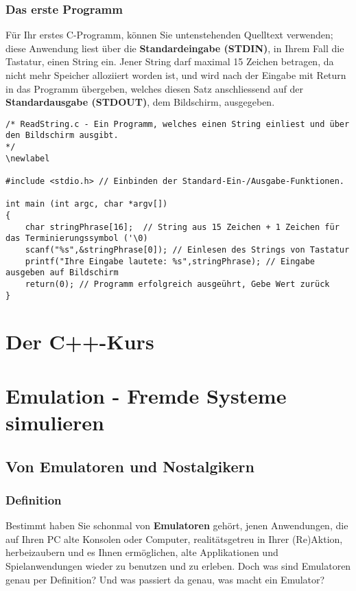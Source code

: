 \documentclass[b5paper,10pt,dvips,fleqn,titlepage,twoside]{book}
\begin{document}
\section{Das erste Programm}
Für Ihr erstes C-Programm, können Sie untenstehenden Quelltext verwenden; diese Anwendung liest über die \textbf{Standardeingabe (STDIN)}, in Ihrem Fall die Tastatur, einen String ein. Jener String darf maximal 15 Zeichen betragen, da nicht mehr Speicher alloziiert worden ist, und wird nach der Eingabe mit Return in das Programm übergeben, welches diesen Satz anschliessend auf der \textbf{Standardausgabe (STDOUT)}, dem Bildschirm, ausgegeben.
\newpage
\begin{verbatim}
/* ReadString.c - Ein Programm, welches einen String einliest und über den Bildschirm ausgibt.
*/
\newlabel

#include <stdio.h> // Einbinden der Standard-Ein-/Ausgabe-Funktionen.

int main (int argc, char *argv[])
{
	char stringPhrase[16];  // String aus 15 Zeichen + 1 Zeichen für das Terminierungssymbol ('\0)
	scanf("%s",&stringPhrase[0]); // Einlesen des Strings von Tastatur
	printf("Ihre Eingabe lautete: %s",stringPhrase); // Eingabe ausgeben auf Bildschirm
	return(0); // Programm erfolgreich ausgeührt, Gebe Wert zurück
}
\end{verbatim}
\part{Der C++-Kurs}
\part{Emulation - Fremde Systeme simulieren}
\chapter{Von Emulatoren und Nostalgikern}
\section{Definition}
Bestimmt haben Sie schonmal von \textbf{Emulatoren} gehört, jenen Anwendungen, die auf Ihren PC alte Konsolen oder Computer, realitätsgetreu in Ihrer (Re)Aktion, herbeizaubern und es Ihnen ermöglichen, alte Applikationen und Spielanwendungen wieder zu benutzen und zu erleben. Doch was sind Emulatoren genau per Definition? Und was passiert da genau, was macht ein Emulator?\newline
\end{document}
